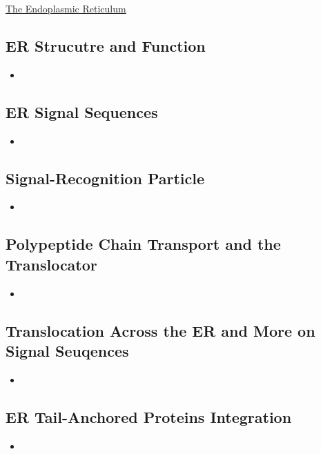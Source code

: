 \documentclass[12pt,letterpaper]{article}
\begin{document}
\hypertarget{12.5}{}
\begin{secbox}{\hyperlink{12}{The Endoplasmic Reticulum}}{
    \hypertarget{12.5.1}{\subsection*{ER Strucutre and Function}}
    \begin{itemize}
        \item
    \end{itemize}

    \hypertarget{12.5.2}{\subsection*{ER Signal Sequences}}
    \begin{itemize}
        \item
    \end{itemize}

    \hypertarget{12.5.3}{\subsection*{Signal-Recognition Particle}}
    \begin{itemize}
        \item
    \end{itemize}

    \hypertarget{12.5.4}{\subsection*{Polypeptide Chain Transport and the Translocator}}
    \begin{itemize}
        \item
    \end{itemize}
    
    \hypertarget{12.5.5}{\subsection*{Translocation Across the ER and More on Signal Seuqences}}
    \begin{itemize}
        \item
    \end{itemize}
    
    \hypertarget{12.5.6}{\subsection*{ER Tail-Anchored Proteins Integration}}
    \begin{itemize}
        \item
    \end{itemize}
    
}
\end{secbox}
\end{document}
